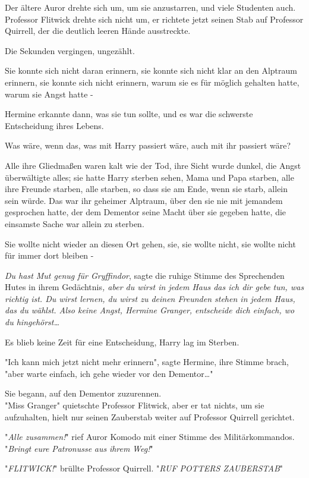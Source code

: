 {Der ältere Auror drehte sich um, um sie anzustarren, und viele Studenten auch. Professor Flitwick drehte sich nicht um, er richtete jetzt seinen Stab auf Professor Quirrell, der die deutlich leeren Hände ausstreckte.

Die Sekunden vergingen, ungezählt.

Sie konnte sich nicht daran erinnern, sie konnte sich nicht klar an den Alptraum erinnern, sie konnte sich nicht erinnern, warum sie es für möglich gehalten hatte, warum sie Angst hatte -

Hermine erkannte dann, was sie tun sollte, und es war die schwerste Entscheidung ihres Lebens.

Was wäre, wenn das, was mit Harry passiert wäre, auch mit ihr passiert wäre?

Alle ihre Gliedmaßen waren kalt wie der Tod, ihre Sicht wurde dunkel, die Angst überwältigte alles; sie hatte Harry sterben sehen, Mama und Papa starben, alle ihre Freunde starben, alle starben, so dass sie am Ende, wenn sie starb, allein sein würde. Das war ihr geheimer Alptraum, über den sie nie mit jemandem gesprochen hatte, der dem Dementor seine Macht über sie gegeben hatte, die einsamste Sache war allein zu sterben.

Sie wollte nicht wieder an diesen Ort gehen, sie, sie wollte nicht, sie wollte nicht für immer dort bleiben -

\emph{Du hast Mut genug für Gryffindor}, sagte die ruhige Stimme des Sprechenden Hutes in ihrem Gedächtnis\emph{, aber du wirst in jedem Haus das ich dir gebe tun, was richtig ist. Du wirst lernen, du wirst zu deinen Freunden stehen in jedem Haus, das du wählst. Also keine Angst, Hermine Granger, entscheide dich einfach, wo du hingehörst…}

Es blieb keine Zeit für eine Entscheidung, Harry lag im Sterben.

"Ich kann mich jetzt nicht mehr erinnern", sagte Hermine, ihre Stimme brach, "aber warte einfach, ich gehe wieder vor den Dementor…"

Sie begann, auf den Dementor zuzurennen.\\ "Miss Granger" quietschte Professor Flitwick, aber er tat nichts, um sie aufzuhalten, hielt nur seinen Zauberstab weiter auf Professor Quirrell gerichtet.

"\emph{Alle zusammen!}" rief Auror Komodo mit einer Stimme des Militärkommandos. "\emph{Bringt} \emph{eure} \emph{Patronusse} \emph{aus} \emph{ihrem} \emph{Weg!}"

"\emph{FLITWICK!}" brüllte Professor Quirrell. "\emph{RUF POTTERS ZAUBERSTAB}"

}
